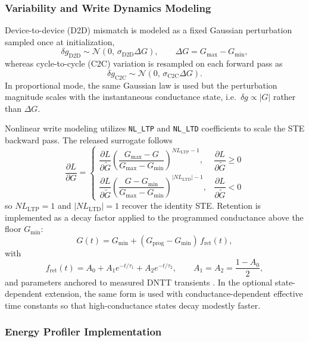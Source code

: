 \subsubsection{Variability and Write Dynamics Modeling}

Device-to-device (D2D) mismatch is modeled as a fixed Gaussian perturbation sampled once at initialization,
\[
\delta g_{\mathrm{D2D}} \sim \mathcal{N}\!\left(0,\, \sigma_{\mathrm{D2D}}\Delta G\right),
\qquad
\Delta G = G_{\max}-G_{\min},
\]
whereas cycle-to-cycle (C2C) variation is resampled on each forward pass as
\[
\delta g_{\mathrm{C2C}} \sim \mathcal{N}\!\left(0,\, \sigma_{\mathrm{C2C}}\Delta G\right).
\]
In proportional mode, the same Gaussian law is used but the perturbation magnitude scales with the instantaneous conductance state, i.e.\ $\delta g \propto |G|$ rather than $\Delta G$.

Nonlinear write modeling utilizes \texttt{NL\_LTP} and \texttt{NL\_LTD} coefficients to scale the STE backward pass. The released surrogate follows
\[
\frac{\partial L}{\partial G}
=
\begin{cases}
\dfrac{\partial L}{\partial \tilde{G}}
\left(\dfrac{G_{\max}-G}{G_{\max}-G_{\min}}\right)^{NL_{\mathrm{LTP}}-1},
& \dfrac{\partial L}{\partial \tilde{G}} \ge 0 \\[10pt]
\dfrac{\partial L}{\partial \tilde{G}}
\left(\dfrac{G-G_{\min}}{G_{\max}-G_{\min}}\right)^{|NL_{\mathrm{LTD}}|-1},
& \dfrac{\partial L}{\partial \tilde{G}} < 0
\end{cases}
\]
so $NL_{\mathrm{LTP}}=1$ and $|NL_{\mathrm{LTD}}|=1$ recover the identity STE. Retention is implemented as a decay factor applied to the programmed conductance above the floor $G_{\min}$:
\[
G(t)=G_{\min}+\left(G_{\mathrm{prog}}-G_{\min}\right)\,f_{\mathrm{ret}}(t),
\]
with
\[
f_{\mathrm{ret}}(t)=A_0 + A_1 e^{-t/\tau_1} + A_2 e^{-t/\tau_2},
\qquad
A_1=A_2=\frac{1-A_0}{2},
\]
and parameters anchored to measured DNTT transients \citep{vincze2026dualplasticity}. In the optional state-dependent extension, the same form is used with conductance-dependent effective time constants so that high-conductance states decay modestly faster.

\subsubsection{Energy Profiler Implementation}

